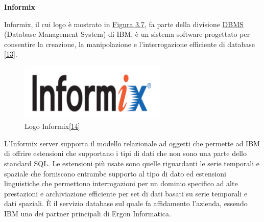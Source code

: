 \textbf{Informix}

Informix, il cui logo è mostrato in \hyperref[ibm]{Figura 3.7}, fa parte della divisione \hyperref[DBMS]{DBMS\glo} (Database Management System) di IBM, è un sistema software progettato per consentire la creazione,
la manipolazione e l'interrogazione efficiente di database \hyperref[informix]{[13]}.

\begin{figure}[H]
	\includegraphics[width=7cm]{immagini/Informix.png}
	\centering
	\caption{Logo Informix\hyperref[ilogo]{[14]}}
	\label{ibm}
\end{figure}


L'Informix server supporta il modello relazionale ad oggetti che permette ad IBM di offrire estensioni che supportano i tipi di dati che non sono una parte dello standard SQL.
Le estensioni più usate sono quelle riguardanti le serie temporali e spaziale che forniscono entrambe supporto al tipo di dato ed estensioni linguistiche che permettono 
interrogazioni per un dominio specifico ad alte prestazioni e archiviazione efficiente per set di dati basati su serie temporali e dati spaziali.
È il servizio database sul quale fa affidamento l'azienda, essendo IBM uno dei partner principali di Ergon Informatica.